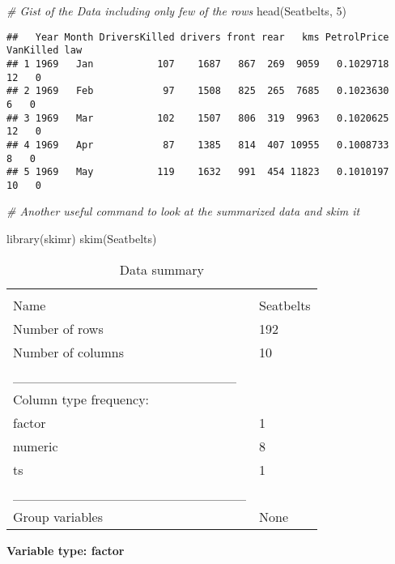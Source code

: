 \documentclass[
]{article}
\newenvironment{Shaded}{\begin{snugshade}}{\end{snugshade}}
\newcommand{\CommentTok}[1]{\textcolor[rgb]{0.56,0.35,0.01}{\textit{#1}}}
\newcommand{\DecValTok}[1]{\textcolor[rgb]{0.00,0.00,0.81}{#1}}
\newcommand{\FunctionTok}[1]{\textcolor[rgb]{0.00,0.00,0.00}{#1}}
\newcommand{\NormalTok}[1]{#1}
\begin{document}
\begin{Shaded}
\begin{Highlighting}[]
\CommentTok{\# Gist of the Data including only few of the rows}
\FunctionTok{head}\NormalTok{(Seatbelts, }\DecValTok{5}\NormalTok{)}
\end{Highlighting}
\end{Shaded}

\begin{verbatim}
##   Year Month DriversKilled drivers front rear   kms PetrolPrice VanKilled law
## 1 1969   Jan           107    1687   867  269  9059   0.1029718        12   0
## 2 1969   Feb            97    1508   825  265  7685   0.1023630         6   0
## 3 1969   Mar           102    1507   806  319  9963   0.1020625        12   0
## 4 1969   Apr            87    1385   814  407 10955   0.1008733         8   0
## 5 1969   May           119    1632   991  454 11823   0.1010197        10   0
\end{verbatim}

\begin{Shaded}
\begin{Highlighting}[]
\CommentTok{\# Another useful command to look at the summarized data and skim it}

\FunctionTok{library}\NormalTok{(skimr)}
\FunctionTok{skim}\NormalTok{(Seatbelts)}
\end{Highlighting}
\end{Shaded}

\begin{longtable}[]{@{}ll@{}}
\caption{Data summary}\tabularnewline
\toprule
& \\
\midrule
\endfirsthead
\toprule
& \\
\midrule
\endhead
Name & Seatbelts \\
Number of rows & 192 \\
Number of columns & 10 \\
\_\_\_\_\_\_\_\_\_\_\_\_\_\_\_\_\_\_\_\_\_\_\_ & \\
Column type frequency: & \\
factor & 1 \\
numeric & 8 \\
ts & 1 \\
\_\_\_\_\_\_\_\_\_\_\_\_\_\_\_\_\_\_\_\_\_\_\_\_ & \\
Group variables & None \\
\bottomrule
\end{longtable}

\textbf{Variable type: factor}
\end{document}
